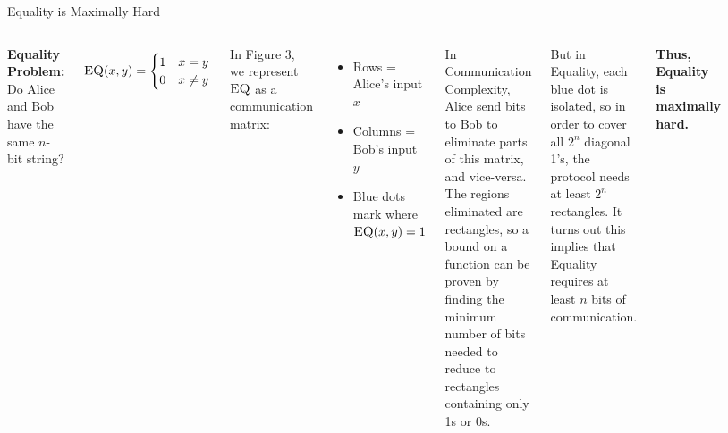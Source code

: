 \begin{block}{Equality is Maximally Hard}

\begin{columns}[T]

\hfill \break
\textbf{Equality Problem:} Do Alice and Bob have the same $n$-bit string?

\[
\textsc{EQ}(x,y)=
\begin{cases}
1 & x=y \\
0 & x\neq y
\end{cases}
\]

\vspace{0.5em}

In Figure 3, we represent $\textsc{EQ}$ as a communication matrix:

\begin{itemize}
    \item Rows = Alice's input $x$
    \item Columns = Bob's input $y$
    \item Blue dots mark where $\textsc{EQ}(x,y)=1$
\end{itemize}

\bigskip

In Communication Complexity, Alice send bits to Bob to eliminate parts of
this matrix, and vice-versa. The regions eliminated are rectangles, so a bound
on a function can be proven by finding the minimum number of bits needed to
reduce to rectangles containing only 1s or 0s.

\vspace{0.5em}

But in Equality, each blue dot is isolated, so in order to cover all $2^n$
diagonal 1’s, the protocol needs at least $2^n$ rectangles. It turns out this
implies that Equality requires at least $n$ bits of communication. \\
\vspace{0.5em}

\textbf{Thus, Equality is maximally hard.}


\begin{figure}[H]
\begin{center}
\end{center}
\end{figure}
\end{columns}
\end{block}
